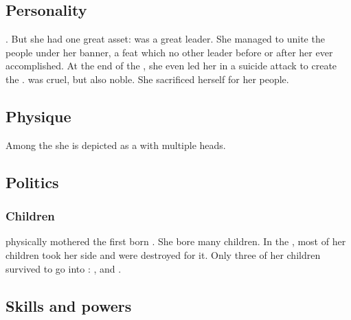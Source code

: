 \subsection{Personality}
\Kserasshana{} . 
But she had one great asset: 
\Kserasshana{} was a great leader. 
She managed to unite the \dzraicchenoss{} people under her banner, a feat which no other leader before or after her ever accomplished. 
At the end of the \firstbanewar, she even led her \firstgendragons{} in a suicide attack to create the . 
\Kserasshana{} was cruel, but also noble. 
She sacrificed herself for her people. 









\subsection{Physique}
Among the \dragons{} she is depicted as a \dragon{} with multiple heads. 









\subsection{Politics}





\subsubsection{Children}
\Tiamat physically mothered the first born \dragons. 
She bore many children.
In the , most of her children took her side and were destroyed for it. 
Only three of her children survived to go into :
\Nexagglachel, \Ishnaruchaefir and \Secherdamon. 









\subsection{Skills and powers}





